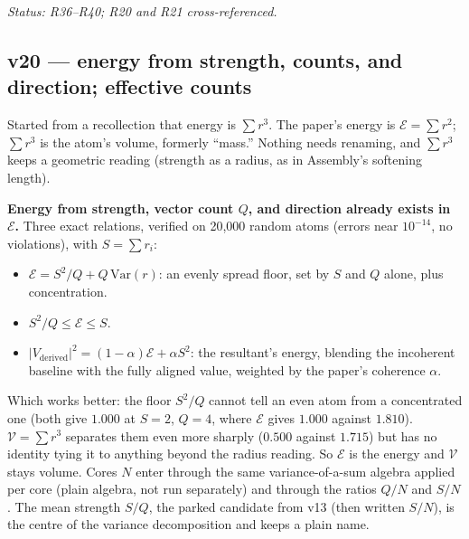 \documentclass[11pt]{article}
\begin{document}
\emph{Status: R36--R40; R20 and R21 cross-referenced.}


\subsection*{v20 --- energy from strength, counts, and direction; effective counts}
Started from a recollection that energy is $\sum r^3$. The paper's
energy is $\mathcal E=\sum r^2$; $\sum r^3$ is the atom's volume,
formerly ``mass.'' Nothing needs renaming, and $\sum r^3$ keeps a
geometric reading (strength as a radius, as in Assembly's softening
length).

\textbf{Energy from strength, vector count $Q$, and direction already
exists in $\mathcal E$.} Three exact relations, verified on 20{,}000
random atoms (errors near $10^{-14}$, no violations), with
$S=\sum r_i$:
\begin{itemize}
\item $\mathcal E=S^2/Q+Q\,\mathrm{Var}(r)$: an evenly spread floor,
set by $S$ and $Q$ alone, plus concentration.
\item $S^2/Q\le\mathcal E\le S$.
\item $|V_{\text{derived}}|^2=(1-\alpha)\mathcal E+\alpha S^2$: the
resultant's energy, blending the incoherent baseline with the fully
aligned value, weighted by the paper's coherence $\alpha$.
\end{itemize}
Which works better: the floor $S^2/Q$ cannot tell an even atom from a
concentrated one (both give $1.000$ at $S=2$, $Q=4$, where $\mathcal E$
gives $1.000$ against $1.810$). $\mathcal V=\sum r^3$ separates them even
more sharply ($0.500$ against $1.715$) but has no identity tying it to
anything beyond the radius reading. So $\mathcal E$ is the energy and
$\mathcal V$ stays volume. Cores $N$ enter through the same
variance-of-a-sum algebra applied per core (plain algebra, not run
separately) and through the ratios $Q/N$ and $S/N$. The mean strength
$S/Q$, the parked candidate from v13 (then written $S/N$), is the centre
of the variance decomposition and keeps a plain name.
\end{document}
